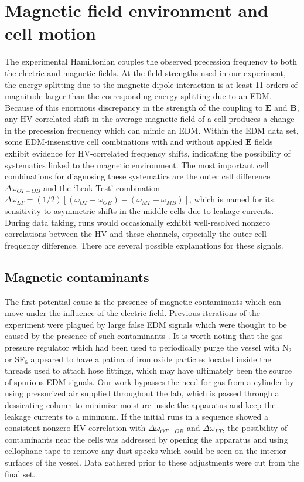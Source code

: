 \documentclass [10pt, twoside] {uwthesis}[2012/04/02]
\begin{document}
\section{Magnetic field environment and cell motion}
The experimental Hamiltonian couples the observed precession frequency to both the electric and magnetic fields. At the field strengths used in our experiment, the energy splitting due to the magnetic dipole interaction is at least 11 orders of magnitude larger than the corresponding energy splitting due to an EDM. Because of this enormous discrepancy in the strength of the coupling to $\mathbf{E}$ and $\mathbf{B}$, any HV-correlated shift in the average magnetic field of a cell produces a change in the precession frequency which can mimic an EDM. Within the EDM data set, some EDM-insensitive cell combinations with and without applied $\mathbf{E}$ fields exhibit evidence for HV-correlated frequency shifts, indicating the possibility of systematics linked to the magnetic environment. The most important cell combinations for diagnosing these systematics are the outer cell difference $\Delta\omega_{OT-OB}$ and the `Leak Test' combination $\Delta\omega_{LT} = (1/2)[(\omega_{OT}+\omega_{OB}) - (\omega_{MT}+\omega_{MB})]$, which is named for its sensitivity to asymmetric shifts in the middle cells due to leakage currents. During data taking, runs would occasionally exhibit well-resolved nonzero correlations between the HV and these channels, especially the outer cell frequency difference. There are several possible explanations for these signals.

\subsection{Magnetic contaminants}
The first potential cause is the presence of magnetic contaminants which can move under the influence of the electric field. Previous iterations of the experiment were plagued by large false EDM signals which were thought to be caused by the presence of such contaminants \cite[Appendix C]{Griffith}. It is worth noting that the gas pressure regulator which had been used to periodically purge the vessel with N$_2$ or SF$_6$ appeared to have a patina of iron oxide particles located inside the threads used to attach hose fittings, which may have ultimately been the source of spurious EDM signals. Our work bypasses the need for gas from a cylinder by using pressurized air supplied throughout the lab, which is passed through a dessicating column to minimize moisture inside the apparatus and keep the leakage currents to a minimum. If the initial runs in a sequence showed a consistent nonzero HV correlation with $\Delta\omega_{OT-OB}$ and $\Delta\omega_{LT}$, the possibility of contaminants near the cells was addressed by opening the apparatus and using cellophane tape to remove any dust specks which could be seen on the interior surfaces of the vessel. Data gathered prior to these adjustments were cut from the final set. 
\end{document}
